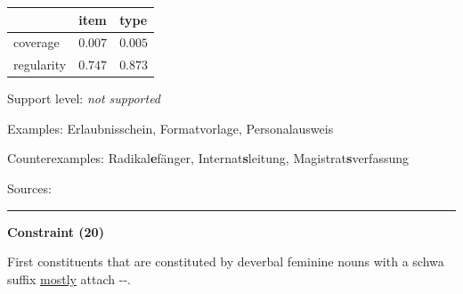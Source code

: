 \vspace{-0.35em}

\begin{table}[!ht]
\begin{center}

\begin{tabularx}{\columnwidth}{|X|X|X|}
\hline
 & item & type \\
\hline
 coverage & $0.007$ & $0.005$ \\
\hline
 regularity & $0.747$ & $0.873$ \\
\hline
\end{tabularx}
\end{center}
\end{table}

\vspace{-1.35em}

\noindent
Support level: \textit{not supported}

\vspace{0.3em}

\noindent
Examples: Erlaubnis{\zeroLinker}schein, Format{\zeroLinker}vorlage, Personal{\zeroLinker}ausweis

\noindent
Counterexamples: Radikal\textbf{e}fänger, Internat\textbf{s}leitung, Magistrat\textbf{s}verfassung

\vspace{0.3em}

\noindent
Sources: \citet[83, 107]{ortner_mueller-bollhagen_1991}


\hrule



\vspace{0.4em}

\begin{center}
\textbf{Constraint (20)}
\end{center}

\noindent
First constituents that are constituted by deverbal feminine nouns with a schwa suffix \underline{mostly} attach \mbox{-{\zeroLinker}-}.
\vspace{0.35em}


